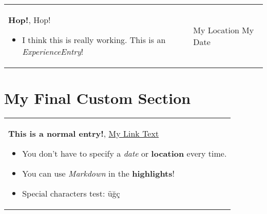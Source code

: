 \documentclass[10pt, a4paper]{article}
\newenvironment{highlights}{
        \begin{itemize}[
                topsep=0pt,
                parsep=0.07 cm,
                partopsep=0pt,
                itemsep=0pt,
                after=\vspace{-1\baselineskip},
                leftmargin=0.6 cm + 3pt
            ]
    }{
        \end{itemize}
    } %
\let\hrefWithoutArrow\href
\renewcommand{\href}[2]{\hrefWithoutArrow{#1}{#2 \raisebox{.15ex}{\footnotesize \faExternalLink*}}}
\begin{document}
        \begin{tabularx}{ cm-0.13cm}{K{0.2 cm} R{3.6 cm}}
            \textbf{Hop!}, Hop!
            \vspace{0.12 cm}
            \begin{highlights}
                \item I think this is really working. This is an \textit{ExperienceEntry}! \hspace*{-0.2cm}
            \end{highlights}
        &
            My Location \newline
            My Date
        \end{tabularx}



    \section{My Final Custom Section}
    
        \begin{tabularx}{ cm-0.13cm}{K{0.2 cm}}
            \textbf{This is a normal entry!}, \href{https://example.com/}{My Link Text}
            \vspace{0.12 cm}
            \begin{highlights}
                \item You don't have to specify a \textit{date} or \textbf{location} every time. 
                \item You can use \textit{Markdown} in the \textbf{highlights}! 
                \item Special characters test: üğç \hspace*{-0.2cm}
            \end{highlights}
        \end{tabularx}
\end{document}
